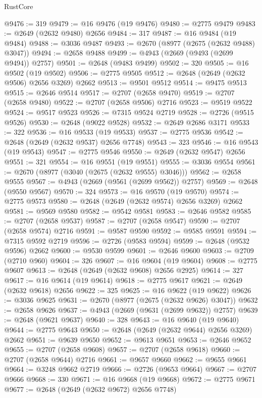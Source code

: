 \begin{lexlean}{RustCore}
\begin{coremodule}
@9476 := 319
@9479 := @16 @9476 (@19 @9476)
@9480 := @2775 @9479
@9483 := @2649 (@2632 @9480) @2656
@9484 := 317
@9487 := @16 @9484 (@19 @9484)
@9488 := @3036 @9487
@9493 := @2670 (@8977 (@2675 (@2632 @9488) @3047))
@9494 := @2658 @9488
@9499 := @4943 (@2669 (@9493 (@2699 @9494)) @2757)
@9501 := @2648 (@9483 @9499)
@9502 := 320
@9505 := @16 @9502 (@19 @9502)
@9506 := @2775 @9505
@9512 := @2648 (@2649 (@2632 @9506) @2656 @3269) @2662
@9513 := @9501 @9512
@9514 := @9475 @9513
@9515 := @2646 @9514
@9517 := @2707 (@2658 @9470)
@9519 := @2707 (@2658 @9480)
@9522 := @2707 (@2658 @9506) @2716
@9523 := @9519 @9522
@9524 := @9517 @9523
@9526 := @7315 @9524 @2719
@9528 := @2726 (@9515 @9526)
@9530 := @2648 (@9022 @9528)
@9532 := @2649 @2686 @3171
@9533 := 322
@9536 := @16 @9533 (@19 @9533)
@9537 := @2775 @9536
@9542 := @2648 (@2649 (@2632 @9537) @2656 @7748)
@9543 := 323
@9546 := @16 @9543 (@19 @9543)
@9547 := @2775 @9546
@9550 := @2649 (@2632 @9547) @2656
@9551 := 321
@9554 := @16 @9551 (@19 @9551)
@9555 := @3036 @9554
@9561 := @2670 (@8977 (@3040 (@2675 (@2632 @9555) @3046)))
@9562 := @2658 @9555
@9567 := @4943 (@2669 (@9561 (@2699 @9562)) @2757)
@9569 := @2648 (@9550 @9567)
@9570 := 324
@9573 := @16 @9570 (@19 @9570)
@9574 := @2775 @9573
@9580 := @2648 (@2649 (@2632 @9574) @2656 @3269) @2662
@9581 := @9569 @9580
@9582 := @9542 @9581
@9583 := @2646 @9582
@9585 := @2707 (@2658 @9537)
@9587 := @2707 (@2658 @9547)
@9590 := @2707 (@2658 @9574) @2716
@9591 := @9587 @9590
@9592 := @9585 @9591
@9594 := @7315 @9592 @2719
@9596 := @2726 (@9583 @9594)
@9599 := @2648 (@9532 @9596) @2662
@9600 := @9530 @9599
@9601 := @2646 @9600
@9603 := @2709 (@2710 @960)
@9604 := 326
@9607 := @16 @9604 (@19 @9604)
@9608 := @2775 @9607
@9613 := @2648 (@2649 (@2632 @9608) @2656 @2925)
@9614 := 327
@9617 := @16 @9614 (@19 @9614)
@9618 := @2775 @9617
@9621 := @2649 (@2632 @9618) @2656
@9622 := 325
@9625 := @16 @9622 (@19 @9622)
@9626 := @3036 @9625
@9631 := @2670 (@8977 (@2675 (@2632 @9626) @3047))
@9632 := @2658 @9626
@9637 := @4943 (@2669 (@9631 (@2699 @9632)) @2757)
@9639 := @2648 (@9621 @9637)
@9640 := 328
@9643 := @16 @9640 (@19 @9640)
@9644 := @2775 @9643
@9650 := @2648 (@2649 (@2632 @9644) @2656 @3269) @2662
@9651 := @9639 @9650
@9652 := @9613 @9651
@9653 := @2646 @9652
@9655 := @2707 (@2658 @9608)
@9657 := @2707 (@2658 @9618)
@9660 := @2707 (@2658 @9644) @2716
@9661 := @9657 @9660
@9662 := @9655 @9661
@9664 := @3248 @9662 @2719
@9666 := @2726 (@9653 @9664)
@9667 := @2707 @9666
@9668 := 330
@9671 := @16 @9668 (@19 @9668)
@9672 := @2775 @9671
@9677 := @2648 (@2649 (@2632 @9672) @2656 @7748)

\end{coremodule}
\end{lexlean}
